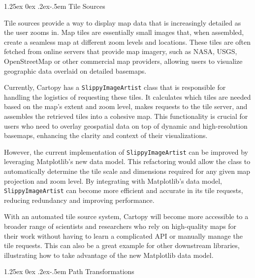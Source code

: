 \documentclass[12pt]{article}
\makeatletter
\numberwithin{page}{section}
\renewcommand{\paragraph}{%
  \@startsection{paragraph}{4}%
  {\z@}{1.25ex \@plus 0ex \@minus .2ex}{-.5em}%
  {\normalfont\normalsize\itshape\bfseries}%
}
\makeatother
\begin{document}
\paragraph{Tile Sources}

Tile sources provide a way to display map data that is increasingly detailed
as the user zooms
in. Map tiles are essentially small images that, when assembled, create a seamless map at
different zoom levels and locations. These tiles are often fetched from online servers
that provide map imagery, such as NASA, USGS, OpenStreetMap or other commercial map providers,
allowing users to visualize geographic data overlaid on detailed basemaps.

Currently, Cartopy has a \texttt{SlippyImageArtist} class that is responsible for handling the
logistics of requesting these tiles. It calculates which tiles are needed based on the
map's extent and zoom level, makes requests to the tile server, and assembles the retrieved
tiles into a cohesive map. This functionality is crucial for users who need to overlay geospatial
data on top of dynamic and high-resolution basemaps, enhancing the clarity and context of
their visualizations.

However, the current implementation of \texttt{SlippyImageArtist} can be improved by leveraging
Matplotlib's new data model. This refactoring would allow the class to automatically determine
the tile scale and dimensions required for any given map projection and zoom level. By integrating
with Matplotlib's data model, \texttt{SlippyImageArtist} can become more efficient and accurate in
its tile requests, reducing redundancy and improving performance.

With an automated tile source system, Cartopy will become more accessible to a broader range of
scientists and researchers who rely on high-quality maps for their work without having to learn
a complicated API or manually manage the tile requests. This can also be a great example for other
downstream libraries, illustrating how to take advantage of the new Matplotlib data model.

\paragraph{Path Transformations}
\end{document}
